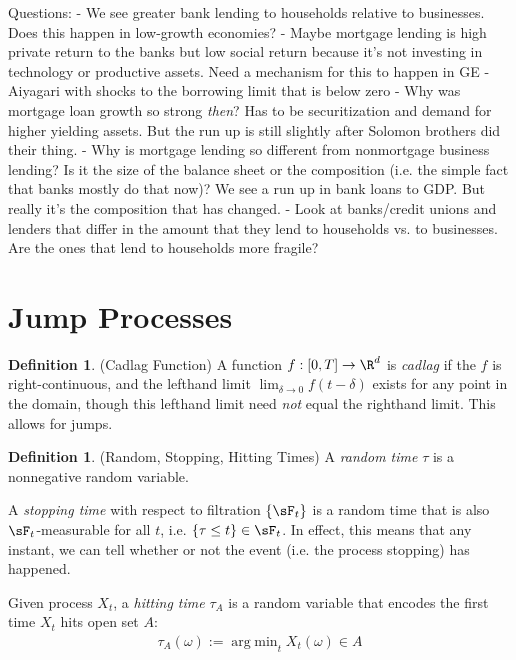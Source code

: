 \documentclass[12pt]{article}
\theoremstyle{plain}
\theoremstyle{definition}
\newtheorem{defn}[thm]{Definition}
\theoremstyle{remark}
\newcommand{\ra}{\rightarrow}
\DeclareMathOperator*{\argmin}{arg\;min}
\begin{document}
Questions:
- We see greater bank lending to households relative to businesses.
  Does this happen in low-growth economies?
- Maybe mortgage lending is high private return to the banks but low
  social return because it's not investing in technology or productive
  assets. Need a mechanism for this to happen in GE
- Aiyagari with shocks to the borrowing limit that is below zero
- Why was mortgage loan growth so strong \emph{then}? Has to be
  securitization and demand for higher yielding assets.
  But the run up is still slightly after Solomon brothers did their
  thing.
- Why is mortgage lending so different from nonmortgage business
  lending? Is it the size of the balance sheet or the composition (i.e.
  the simple fact that banks mostly do that now)?
  We see a run up in bank loans to GDP. But really it's the composition
  that has changed.
- Look at banks/credit unions and lenders that differ in the amount that
  they lend to households vs. to businesses. Are the ones that lend to
  households more fragile?


\clearpage
\section{Jump Processes}


\begin{defn}(Cadlag Function)
A function $f:[0,T]\ra\R^d$ is \emph{cadlag} if the $f$ is
right-continuous, and the lefthand limit $\lim_{\delta \ra 0}
f(t-\delta)$ exists for any point in the domain, though this lefthand
limit need \emph{not} equal the righthand limit.
This allows for jumps.
\end{defn}
\begin{defn}(Random, Stopping, Hitting Times)
A \emph{random time} $\tau$ is a nonnegative random variable.

A \emph{stopping time} with respect to filtration $\{\sF_t\}$ is a
random time that is also $\sF_t$-measurable for all $t$, i.e.
$\{\tau\leq t\}\in\sF_t$. In effect, this means that any instant, we can
tell whether or not the event (i.e. the process stopping) has happened.

Given process $X_t$, a \emph{hitting time} $\tau_A$ is a random variable
that encodes the first time $X_t$ hits open set $A$:
\begin{align*}
  \tau_A(\omega):=\argmin_{t} X_t(\omega)\in A
\end{align*}
\end{defn}
\end{document}
